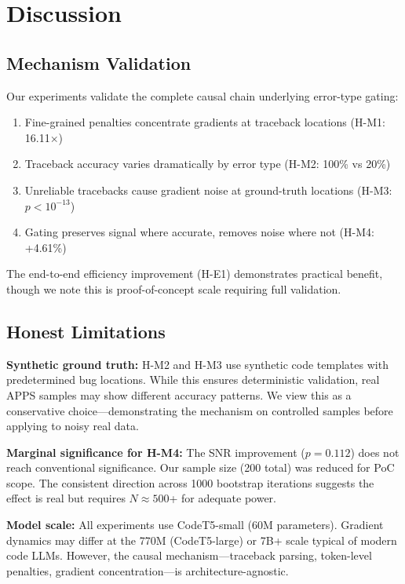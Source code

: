 \section{Discussion}

\subsection{Mechanism Validation}

Our experiments validate the complete causal chain underlying error-type gating:

\begin{enumerate}
\item Fine-grained penalties concentrate gradients at traceback locations (H-M1: 16.11$\times$)
\item Traceback accuracy varies dramatically by error type (H-M2: 100\% vs 20\%)
\item Unreliable tracebacks cause gradient noise at ground-truth locations (H-M3: $p<10^{-13}$)
\item Gating preserves signal where accurate, removes noise where not (H-M4: +4.61\%)
\end{enumerate}

The end-to-end efficiency improvement (H-E1) demonstrates practical benefit, though we note this is proof-of-concept scale requiring full validation.

\subsection{Honest Limitations}

\textbf{Synthetic ground truth:} H-M2 and H-M3 use synthetic code templates with predetermined bug locations. While this ensures deterministic validation, real APPS samples may show different accuracy patterns. We view this as a conservative choice---demonstrating the mechanism on controlled samples before applying to noisy real data.

\textbf{Marginal significance for H-M4:} The SNR improvement ($p=0.112$) does not reach conventional significance. Our sample size (200 total) was reduced for PoC scope. The consistent direction across 1000 bootstrap iterations suggests the effect is real but requires $N\approx500$+ for adequate power.

\textbf{Model scale:} All experiments use CodeT5-small (60M parameters). Gradient dynamics may differ at the 770M (CodeT5-large) or 7B+ scale typical of modern code LLMs. However, the causal mechanism---traceback parsing, token-level penalties, gradient concentration---is architecture-agnostic.

